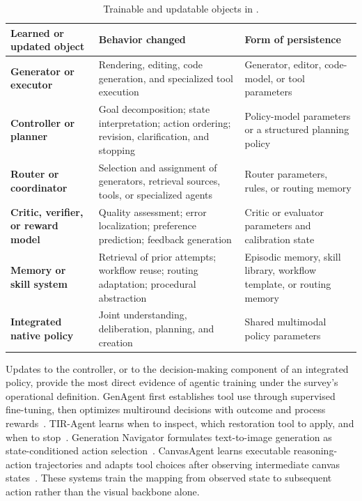 \begin{table}[t]
  \caption{Trainable and updatable objects in \AVG{}.}
  \label{tab:training-targets}
  \small
  \setlength{\tabcolsep}{5pt}
  \renewcommand{\arraystretch}{1.08}
  \renewcommand{\tabularxcolumn}[1]{m{#1}}
  \begin{tabularx}{\textwidth}{@{}
    >{\raggedright\arraybackslash\bfseries}m{}
    >{\raggedright\arraybackslash}m{}
    >{\raggedright\arraybackslash}X@{}}
    \toprule
    Learned or updated object & \textbf{Behavior changed} & \textbf{Form of persistence} \\
    \midrule
    Generator or executor & Rendering, editing, code generation, and specialized tool execution & Generator, editor, code-model, or tool parameters \\
    \midrule
    Controller or planner & Goal decomposition; state interpretation; action ordering; revision, clarification, and stopping & Policy-model parameters or a structured planning policy \\
    \midrule
    Router or coordinator & Selection and assignment of generators, retrieval sources, tools, or specialized agents & Router parameters, rules, or routing memory \\
    \midrule
    Critic, verifier, or reward model & Quality assessment; error localization; preference prediction; feedback generation & Critic or evaluator parameters and calibration state \\
    \midrule
    Memory or skill system & Retrieval of prior attempts; workflow reuse; routing adaptation; procedural abstraction & Episodic memory, skill library, workflow template, or routing memory \\
    \midrule
    Integrated native policy & Joint understanding, deliberation, planning, and creation & Shared multimodal policy parameters \\
    \bottomrule
  \end{tabularx}
\end{table}
\FloatBarrier

Updates to the controller, or to the decision-making component of an integrated policy, provide the most direct evidence of agentic training under the survey's operational definition. GenAgent first establishes tool use through supervised fine-tuning, then optimizes multiround decisions with outcome and process rewards~\cite{jiang2026genagent}. TIR-Agent learns when to inspect, which restoration tool to apply, and when to stop~\cite{avg260327742}. Generation Navigator formulates text-to-image generation as state-conditioned action selection~\cite{avg260517969}. CanvasAgent learns executable reasoning-action trajectories and adapts tool choices after observing intermediate canvas states~\cite{avg260705465}. These systems train the mapping from observed state to subsequent action rather than the visual backbone alone.

